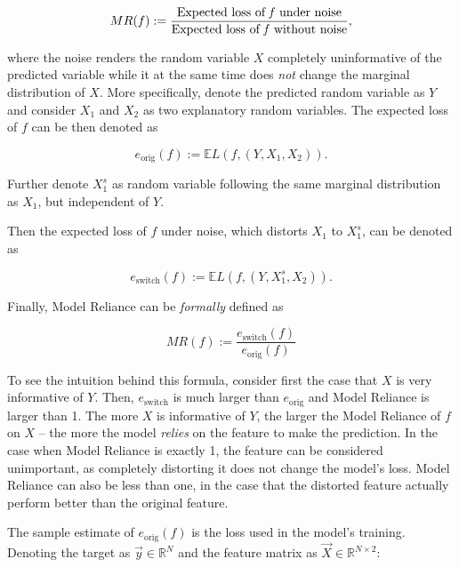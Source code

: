 		\begin{equation}
			MR(f):=\frac{\text{Expected loss of \textit{f} under noise}}{\text{Expected loss of \textit{f} without noise}},
		\end{equation}
		
		where the noise renders the random variable $X$ completely uninformative of the predicted variable while it at the same time does \textit{not} change the marginal distribution of $X$. More specifically, denote the predicted random variable as $Y$ and consider $X_1$ and $X_2$ as two explanatory random variables. The expected loss of $f$ can be then denoted as 
		
		\begin{equation}
			e_{\text{orig}}(f):= \mathbb{E} L(f,(Y,X_1, X_2)).
		\end{equation} 
		
		Further denote $X_1^s$ as random variable following the same marginal distribution as $X_1$, but independent of $Y$. 
		
		Then the expected loss of $f$ under noise, which distorts $X_1$ to $X_1^s$, can be denoted as 
		
		\begin{equation}
			e_{\text{switch}}(f):= \mathbb{E} L(f,(Y,X_1^s, X_2)).
		\end{equation} 
		
		Finally, Model Reliance can be \textit{formally} defined as 
		
		\begin{equation}
			MR(f):=\frac{e_{\text{switch}}(f)}{e_{\text{orig}}(f)}
		\end{equation}
		
		To see the intuition behind this formula, consider first the case that $X$ is very informative of $Y$. Then, 	$e_{\text{switch}}$ is much larger than $e_{\text{orig}}$ and Model Reliance is larger than 1. The more $X$ is informative of $Y$, the larger the  Model Reliance of $f$ on $X$ – the more the model \textit{relies} on the feature to make the prediction. In the case when Model Reliance is exactly 1, the feature can be considered unimportant, as completely distorting it does not change the model's loss. Model Reliance can also be less than one, in the case that the distorted feature actually perform better than the original feature.
				
		The sample estimate of $e_{\text{orig}}(f)$ is the loss used in the model's training. Denoting the target as $\vec{y} \in \mathbb{R}^N$ and the feature matrix as $\vec{X} \in \mathbb{R}^{N\times2}$:
		
